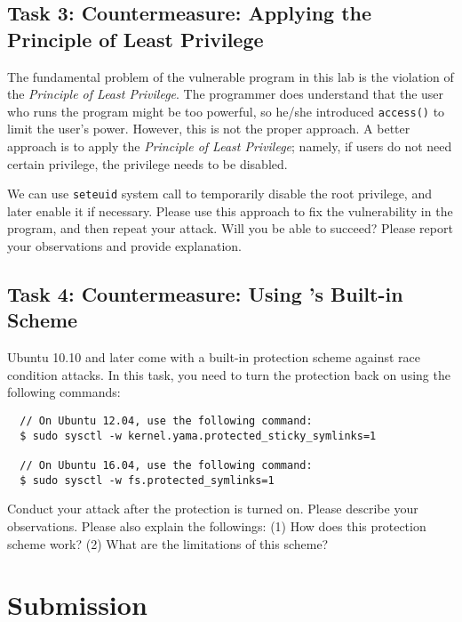 \subsection{Task 3: Countermeasure: Applying the Principle of Least Privilege}

The fundamental problem of the vulnerable program in this lab is 
the violation of the {\em Principle of Least Privilege}. 
The programmer does understand that the user who runs the program 
might be too powerful, so he/she introduced {\tt access()} to limit the user's 
power. However, this is not the proper approach. A better
approach is to apply the {\em Principle of Least Privilege}; 
namely, if users do not need certain privilege, the privilege
needs to be disabled.

We can use {\tt seteuid{}} system call to temporarily disable
the root privilege, and later enable it if necessary. Please use 
this approach to fix the vulnerability in the program, and then
repeat your attack. Will you be able to succeed? Please report your
observations and provide explanation.



\subsection{Task 4: Countermeasure: Using \ubuntu's Built-in Scheme}

Ubuntu 10.10 and later come with a built-in protection scheme against race condition
attacks. In this task, you need to turn the protection back on using the
following commands:

\begin{lstlisting}
  // On Ubuntu 12.04, use the following command:
  $ sudo sysctl -w kernel.yama.protected_sticky_symlinks=1

  // On Ubuntu 16.04, use the following command:
  $ sudo sysctl -w fs.protected_symlinks=1
\end{lstlisting}

Conduct your attack after the protection is turned on.  
Please describe your observations. Please also explain
the followings: (1) How does this protection scheme work?
(2) What are the limitations of this scheme?






\section{Submission}

\seedsubmission



